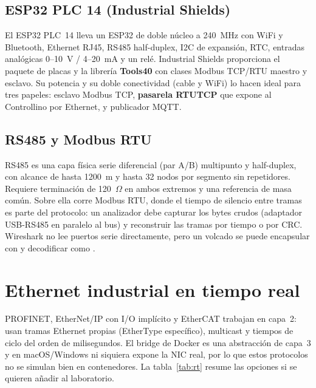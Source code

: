 \subsection{ESP32 PLC 14 (Industrial Shields)}

El ESP32 PLC~14 lleva un ESP32 de doble núcleo a 240~MHz con WiFi y Bluetooth, Ethernet RJ45, RS485 half-duplex, I2C de expansión, RTC, entradas analógicas 0--10~V / 4--20~mA y un relé. Industrial Shields proporciona el paquete de placas  y la librería \textbf{Tools40} con clases Modbus TCP/RTU maestro y esclavo. Su potencia y su doble conectividad (cable y WiFi) lo hacen ideal para tres papeles: esclavo Modbus TCP, \textbf{pasarela RTU\ra{}TCP} que expone al Controllino por Ethernet, y publicador MQTT.

\subsection{RS485 y Modbus RTU}

RS485 es una capa física serie diferencial (par A/B) multipunto y half-duplex, con alcance de hasta 1200~m y hasta 32 nodos por segmento sin repetidores. Requiere terminación de 120~$\Omega$ en ambos extremos y una referencia de masa común. Sobre ella corre Modbus RTU, donde el tiempo de silencio entre tramas es parte del protocolo: un analizador debe capturar los bytes crudos (adaptador USB-RS485 en paralelo al bus) y reconstruir las tramas por tiempo o por CRC. Wireshark no lee puertos serie directamente, pero un volcado se puede encapsular con  y decodificar como .

\section{Ethernet industrial en tiempo real}
\label{sec:rt}

PROFINET, EtherNet/IP con I/O implícito y EtherCAT trabajan en capa~2: usan tramas Ethernet propias (EtherType específico), multicast y tiempos de ciclo del orden de milisegundos. El bridge de Docker es una abstracción de capa~3 y en macOS/Windows ni siquiera expone la NIC real, por lo que estos protocolos no se simulan bien en contenedores. La tabla~\ref{tab:rt} resume las opciones si se quieren añadir al laboratorio.

